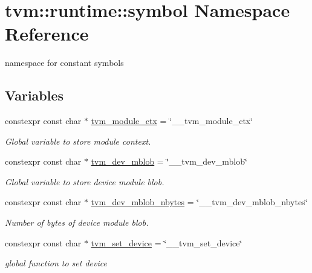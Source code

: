\hypertarget{namespacetvm_1_1runtime_1_1symbol}{}\section{tvm\+:\+:runtime\+:\+:symbol Namespace Reference}
\label{namespacetvm_1_1runtime_1_1symbol}


namespace for constant symbols  


\subsection*{Variables}
\begin{DoxyCompactItemize}
\item 
constexpr const char $\ast$ \hyperlink{namespacetvm_1_1runtime_1_1symbol_aeebcec34a8e6cc24c495710aedea5de9}{tvm\+\_\+module\+\_\+ctx} = \char`\"{}\+\_\+\+\_\+tvm\+\_\+module\+\_\+ctx\char`\"{}
\begin{DoxyCompactList}\small\item\em Global variable to store module context. \end{DoxyCompactList}\item 
constexpr const char $\ast$ \hyperlink{namespacetvm_1_1runtime_1_1symbol_a316b327224938ffb2a73a9c4432d1da9}{tvm\+\_\+dev\+\_\+mblob} = \char`\"{}\+\_\+\+\_\+tvm\+\_\+dev\+\_\+mblob\char`\"{}
\begin{DoxyCompactList}\small\item\em Global variable to store device module blob. \end{DoxyCompactList}\item 
constexpr const char $\ast$ \hyperlink{namespacetvm_1_1runtime_1_1symbol_aba35391edf7c3a25628bf99ed42cdca1}{tvm\+\_\+dev\+\_\+mblob\+\_\+nbytes} = \char`\"{}\+\_\+\+\_\+tvm\+\_\+dev\+\_\+mblob\+\_\+nbytes\char`\"{}
\begin{DoxyCompactList}\small\item\em Number of bytes of device module blob. \end{DoxyCompactList}\item 
constexpr const char $\ast$ \hyperlink{namespacetvm_1_1runtime_1_1symbol_aaad9cf8f51a55b2ec5b19854d692bd21}{tvm\+\_\+set\+\_\+device} = \char`\"{}\+\_\+\+\_\+tvm\+\_\+set\+\_\+device\char`\"{}
\begin{DoxyCompactList}\small\item\em global function to set device \end{DoxyCompactList}\item 

\end{DoxyCompactItemize}
